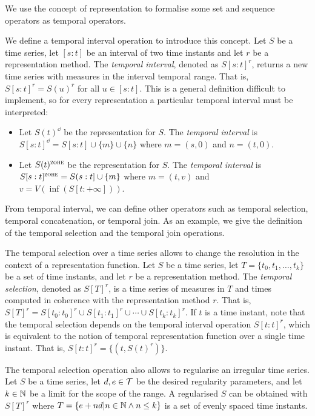 We use the concept of representation to formalise some set and
sequence operators as temporal operators.

We define a temporal interval operation to introduce this concept.
Let $S$ be a time series, let $[s:t]$ be an interval of two time
instants and let $r$ be a representation method. The \emph{temporal
  interval}, denoted as $S[s:t]^r$, returns a new time series with
measures in the interval temporal range. That is, $S[s:t]^r = S(u)^r$
for all $u \in [s:t]$. This is a general definition difficult to
implement, so for every representation a particular temporal interval
must be interpreted:

\begin{itemize}
\item Let $S(t)^\dd$ be the \dd{} representation for $S$. The
  \emph{\dd{} temporal interval} is $S[s:t]^\dd = S[s:t]
  \cup \{m\} \cup \{n\}$ where $m=(s,0)$ and $n=(t,0)$.

\item Let $S(t)^\zohe{}$ be the \zohe{} representation for $S$. The
  \emph{\zohe{} temporal interval} is $S[s:t]^\zohe{} = S(s:t]
  \cup \{m\}$ where $m=(t,v)$ and $v= V(\inf( S[t:+\infty] ))$.
\end{itemize}



From temporal interval, we can define other operators such as temporal
selection, temporal concatenation, or temporal join. As an example, we
give the definition of the temporal selection and the temporal join
operations.

The temporal selection over a time series allows to change the
resolution in the context of a representation function.  Let $S$ be a
time series, let $T=\{t_0,t_1,\dotsc,t_k\}$ be a set of time instants,
and let $r$ be a representation method. The \emph{temporal selection},
denoted as $S[T]^r$, is a time series of measures in $T$ and times
computed in coherence with the representation method $r$. That is,
$S[T]^r = S[t_0:t_0]^r \cup S[t_1:t_1]^r \cup \dotsb \cup
S[t_k:t_k]^r$. If $t$ is a time instant, note that the temporal
selection depends on the temporal interval operation $S[t:t]^r$, which
is equivalent to the notion of temporal representation function over a
single time instant. That is, $S[t:t]^r = \{ (t, S(t)^r) \}$.

The temporal selection operation also allows to regularise an
irregular time series. Let $S$ be a time series, let $d,e\in\cal{T}$
be the desired regularity parameters, and let $k\in\mathbb{N}$ be a limit for
the scope of the range.  A regularised $S$ can be obtained with
$S[T]^r$ where $T = \{e+nd | n\in\mathbb{N} \wedge n\leq k \}$ is a set of
evenly spaced time instants.


